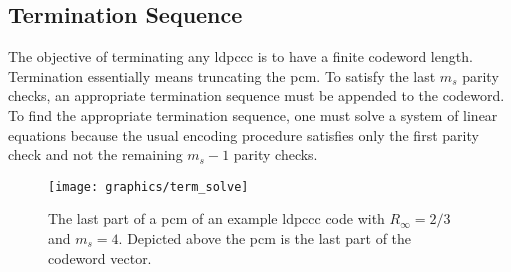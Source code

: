\subsection{Termination Sequence}\label{sec:bpl_termi}
The objective of terminating any \ac{ldpccc} is to have a finite codeword length. Termination essentially means truncating the \ac{pcm}. To satisfy the last $m_s$ parity checks, an appropriate termination sequence must be appended to the codeword. To find the appropriate termination sequence, one must solve a system of linear equations because the usual encoding procedure satisfies only the first parity check and not the remaining $m_s-1$ parity checks.
\begin{figure}[htbp]
  \centering
  \texttt{[image: graphics/term\_solve]}
  \caption{The last part of a \ac{pcm} of an example \ac{ldpccc} code with $R_\infty=2/3$ and $m_s=4$. Depicted above the \ac{pcm} is the last part of the codeword vector.}
  \label{fig:bpl_term}
\end{figure}

